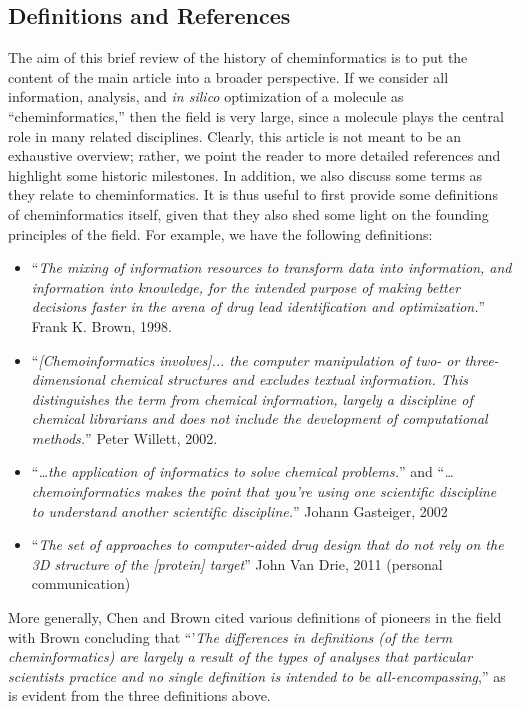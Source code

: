 \documentclass{sig-alternate}
\begin{document}
\subsection{Definitions and References}
The aim of this brief review of the history of cheminformatics is to
put the content of the main article into a broader perspective. If we
consider all information, analysis, and \emph{in silico} optimization
of a molecule as ``cheminformatics,'' then the field is very large,
since a molecule plays the central role in many related
disciplines. Clearly, this article is not meant to be an exhaustive
overview; rather, we point the reader to more detailed references and
highlight some historic milestones.  In addition, we also discuss
some terms as they relate to cheminformatics.  It is thus useful to
first provide some definitions of cheminformatics itself, given that
they also shed some light on the founding principles of the field. For
example, we have the following definitions:
\begin{itemize}
\item ``\textit{The mixing of information resources to transform data
    into information, and information into knowledge, for the intended
    purpose of making better decisions faster in the arena of drug
    lead identification and optimization.}'' Frank K. Brown, 1998.
\item ``\textit{[Chemoinformatics involves]... the computer
    manipulation of two- or three-dimensional chemical structures and
    excludes textual information. This distinguishes the term from
    chemical information, largely a discipline of chemical librarians
    and does not include the development of computational methods.}''
  Peter Willett, 2002.
\item ``\textit{\ldots the application of informatics to solve chemical
    problems.}'' and ``\textit{\ldots chemoinformatics makes the point that
    you're using one scientific discipline to understand another
    scientific discipline.}'' Johann Gasteiger, 2002
\item ``\textit{The set of approaches to computer-aided drug design
    that do not rely on the 3D structure of the [protein] target}''
  John Van Drie, 2011 (personal communication)
\end{itemize}
More generally, Chen \cite{Chen2006} and Brown \cite{brown2009} cited various
definitions of pioneers in the field with Brown concluding that
``'\textit{The differences in definitions (of the term
  cheminformatics) are largely a result of the types of analyses that
  particular scientists practice and no single definition is intended
  to be all-encompassing},'' as is evident from the three definitions above.
\end{document}
